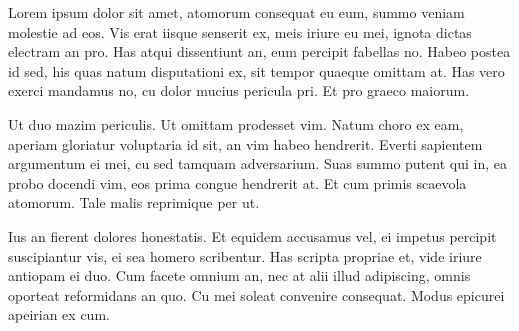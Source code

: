 \documentclass{article}
\begin{document}
Lorem ipsum dolor sit amet, atomorum consequat eu eum, summo veniam 
molestie ad eos. Vis erat iisque senserit ex, meis iriure eu mei, 
ignota dictas electram an pro. Has atqui dissentiunt an, eum percipit 
fabellas no. Habeo postea id sed, his quas natum disputationi ex, sit 
tempor quaeque omittam at. Has vero exerci mandamus no, cu dolor 
mucius pericula pri. Et pro graeco maiorum.

Ut duo mazim periculis. Ut omittam prodesset vim. Natum choro ex eam, 
aperiam gloriatur voluptaria id sit, an vim habeo hendrerit. Everti 
sapientem argumentum ei mei, cu sed tamquam adversarium. Suas summo 
putent qui in, ea probo docendi vim, eos prima congue hendrerit at. 
Et cum primis scaevola atomorum. Tale malis reprimique per ut.

Ius an fierent dolores honestatis. Et equidem accusamus vel, ei 
impetus percipit suscipiantur vis, ei sea homero scribentur. Has 
scripta propriae et, vide iriure antiopam ei duo. Cum facete omnium 
an, nec at alii illud adipiscing, omnis oporteat reformidans an quo. 
Cu mei soleat convenire consequat. Modus epicurei apeirian ex cum.
\end{document}
